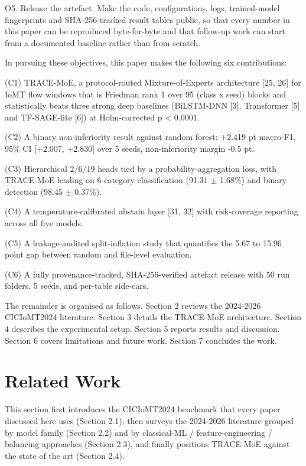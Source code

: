 \documentclass[11pt]{article}
\begin{document}
O5. Release the artefact. Make the code, configurations, logs, trained-model fingerprints and SHA-256-tracked result tables public, so that every number in this paper can be reproduced byte-for-byte and that follow-up work can start from a documented baseline rather than from scratch.

In pursuing these objectives, this paper makes the following six contributions:

(C1) TRACE-MoE, a protocol-routed Mixture-of-Experts architecture [25, 26] for IoMT flow windows that is Friedman rank 1 over 95 (class x seed) blocks and statistically beats three strong deep baselines (BiLSTM-DNN [3], Transformer [5] and TF-SAGE-lite [6]) at Holm-corrected p < 0.0001.

(C2) A binary non-inferiority result against random forest: +2.419 pt macro-F1, 95\% CI [+2.007, +2.830] over 5 seeds, non-inferiority margin -0.5 pt.

(C3) Hierarchical 2/6/19 heads tied by a probability-aggregation loss, with TRACE-MoE leading on 6-category classification (91.31 $\pm$ 1.68\%) and binary detection (98.45 $\pm$ 0.37\%).

(C4) A temperature-calibrated abstain layer [31, 32] with risk-coverage reporting across all five models.

(C5) A leakage-audited split-inflation study that quantifies the 5.67 to 15.96 point gap between random and file-level evaluation.

(C6) A fully provenance-tracked, SHA-256-verified artefact release with 50 run folders, 5 seeds, and per-table side-cars.

The remainder is organised as follows. Section 2 reviews the 2024-2026 CICIoMT2024 literature. Section 3 details the TRACE-MoE architecture. Section 4 describes the experimental setup. Section 5 reports results and discussion. Section 6 covers limitations and future work. Section 7 concludes the work.

\section{Related Work}
This section first introduces the CICIoMT2024 benchmark that every paper discussed here uses (Section 2.1), then surveys the 2024-2026 literature grouped by model family (Section 2.2) and by classical-ML / feature-engineering / balancing approaches (Section 2.3), and finally positions TRACE-MoE against the state of the art (Section 2.4).
\end{document}
